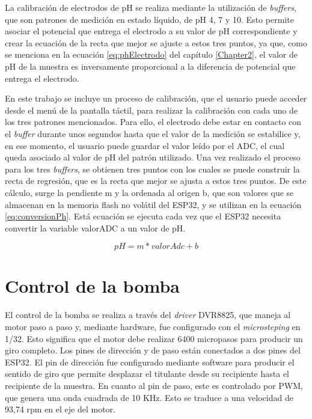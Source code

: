 La calibración de electrodos de pH se realiza mediante la utilización de \textit{buffers}, que son patrones de medición en estado líquido, de pH 4, 7 y 10. Esto permite asociar el potencial que entrega el electrodo a su valor de pH correspondiente y crear la ecuación de la recta que mejor se ajuste a estos tres puntos, ya que, como se menciona en la ecuación \ref{eq:phElectrodo} del capítulo \ref{Chapter2}, el valor de pH de la muestra es inversamente proporcional a la diferencia de potencial que entrega el electrodo.

En este trabajo se incluye un proceso de calibración, que el usuario puede acceder desde el menú de la pantalla táctil, para realizar la calibración con cada uno de los tres patrones mencionados. Para ello, el electrodo debe estar en contacto con el \textit{buffer} durante unos segundos hasta que el valor de la medición se estabilice y, en ese momento, el usuario puede guardar el valor leído por el ADC, el cual queda asociado al valor de pH del patrón utilizado. Una vez realizado el proceso para los tres \textit{buffers}, se obtienen tres puntos con los cuales se puede construir la recta de regresión, que es la recta que mejor se ajusta a estos tres puntos. De este cálculo, surge la pendiente m y la ordenada al origen b, que son valores que se almacenan en la memoria flash no volátil del ESP32, y se utilizan en la ecuación \ref{eq:conversionPh}. Está ecuación se ejecuta cada vez que el ESP32 necesita convertir la variable valorADC a un valor de pH.

\begin{equation}
	\label{eq:conversionPh}
pH = m * valorAdc + b
\end{equation}


\section{Control de la bomba}

El control de la bomba se realiza a través del \textit{driver} DVR8825, que maneja al motor paso a paso y, mediante hardware, fue configurado con el \textit{microsteping} en 1/32. Esto significa que el motor debe realizar 6400 micropasos para producir un giro completo. Los pines de dirección y de paso están conectados a dos pines del ESP32. El pin de dirección fue configurado mediante software para producir el sentido de giro que permite desplazar el titulante desde su recipiente hasta el recipiente de la muestra. En cuanto al pin de paso, este es controlado por PWM, que genera una onda cuadrada de 10 KHz. Esto se traduce a una velocidad de 93,74 rpm en el eje del motor.

